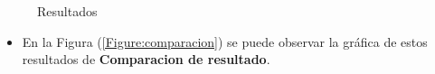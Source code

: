 \documentclass[a4paper,twocolumn,10pt]{article}
\begin{document}
\begin{figure}
 \caption{Resultados}\label{Figure:dijkstra}
    
\end{figure}


\begin{itemize}
 \item En la Figura (\ref{Figure:comparacion}) se puede observar la gráfica de estos resultados de \textbf{Comparacion de resultado}.
\end{itemize}
\end{document}
